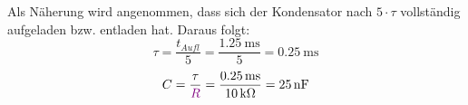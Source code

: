 \documentclass[11pt,a4paper,titlepage]{scrreprt}
\begin{document}
            		  
            		  Als Näherung wird angenommen, dass sich der Kondensator nach $5 \cdot \tau$ vollständig aufgeladen bzw. entladen hat. Daraus folgt:
            		  \begin{equation*}
            		  	\tau = \frac{t_{Aufl}}{5} = \frac{\SI{1,25}{\milli\second}}{5} = \SI{0,25}{\milli\second}						
            		  	\end{equation*}
            		  \begin{equation*}
            		  	C = \frac{\tau}{\textcolor{violet}{R}} = \frac{\SI{0,25}{\milli\second}}{\SI{10}{\kilo\ohm}} = \SI{25}{\nano\farad}
            		  \end{equation*}
\end{document}

